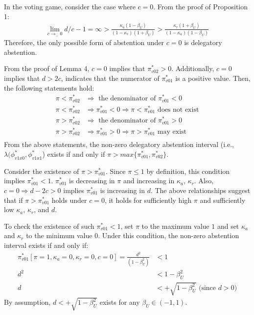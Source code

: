 \par In the voting game, consider the case where $c=0$. From the proof of Proposition 1:
\begin{align*}
\lim_{c \to_{-} 0} d/c - 1 = \infty > \frac{\kappa_a(1-\beta_U)}{(1-\kappa_r)(1+\beta_U)} > \frac{\kappa_r(1+\beta_U)}{(1-\kappa_a)(1-\beta_U)}
\end{align*}
\noindent Therefore, the only possible form of abstention under $c=0$ is delegatory abstention. 

\par From the proof of Lemma 4, $c=0$ implies that $\pi^*_{v02}>0$. Additionally, $c=0$ implies that $d > 2c$, indicates that the numerator of $\pi^*_{v01}$ is a positive value. Then, the following statements hold:
\begin{align*}
\pi<\pi^*_{v02} &\Rightarrow \text{ the denominator of $\pi^*_{v01} < 0$} \\
\pi<\pi^*_{v02} &\Rightarrow \pi^*_{v01} < 0 \Rightarrow \pi < \pi^*_{v01} \text{ does not exist} \\
\pi>\pi^*_{v02} &\Rightarrow \text{ the denominator of $\pi^*_{v01} > 0$} \\
\pi>\pi^*_{v02} &\Rightarrow \pi^*_{v01} > 0 \Rightarrow \pi > \pi^*_{v01} \text{ may exist} \\
\end{align*}
\noindent From the above statements, the non-zero delegatory abstention interval (i.e., $\lambda(\phi^*_{v1x0},\phi^*_{v1x1}$) exists if and only if $\pi > max\{\pi^*_{v01},\pi^*_{v02}\}$.

\par Consider the existence of $\pi > \pi^*_{v01}$. Since $\pi \leq 1$ by definition, this condition implies $\pi^*_{v01} < 1$. $\pi^*_{v01}$ is decreasing in $\pi$ and increasing in $\kappa_a$, $\kappa_r$. Also, $c=0 \Rightarrow d - 2c > 0$ implies $\pi^*_{v01}$ is increasing in $d$. The above relationships suggest that if $\pi > \pi^*_{v01}$ holds under $c=0$, it holds for sufficiently high $\pi$ and sufficiently low $\kappa_a$, $\kappa_r$, and $d$.

\par To check the existence of such $\pi^*_{v01} < 1$, set $\pi$ to the maximum value $1$ and set $\kappa_a$ and $\kappa_r$ to the minimum value $0$. Under this condition, the non-zero abstention interval exists if and only if:
\begin{align*}
\pi^*_{v01}[\pi=1,\kappa_a=0,\kappa_r=0,c=0] = \frac{d^2 }{(1 - \beta_U^2)} &< 1\\
d^2 &< 1 - \beta_U^2 \\
d &< +\sqrt{1 - \beta_U^2} \text{ (since $d>0$)} 
\end{align*}
\noindent By assumption, $d < +\sqrt{1 - \beta_U^2}$ exists for any $\beta_U \in (-1,1)$. 

